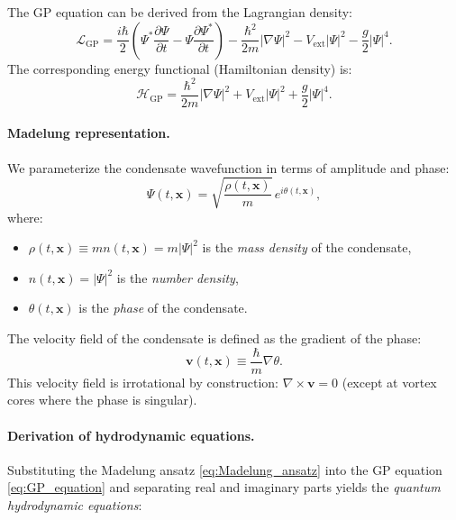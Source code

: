 The GP equation can be derived from the Lagrangian density:
\begin{equation}
\label{eq:GP_Lagrangian}
\mathcal{L}_{\mathrm{GP}} = \frac{i\hbar}{2}\left( \Psi^* \frac{\partial \Psi}{\partial t} - \Psi \frac{\partial \Psi^*}{\partial t} \right) - \frac{\hbar^2}{2m} |\nabla \Psi|^2 - V_{\mathrm{ext}} |\Psi|^2 - \frac{g}{2} |\Psi|^4.
\end{equation}
The corresponding energy functional (Hamiltonian density) is:
\begin{equation}
\label{eq:GP_energy}
\mathcal{H}_{\mathrm{GP}} = \frac{\hbar^2}{2m} |\nabla \Psi|^2 + V_{\mathrm{ext}} |\Psi|^2 + \frac{g}{2} |\Psi|^4.
\end{equation}

\paragraph{Madelung representation.}
We parameterize the condensate wavefunction in terms of amplitude and phase:
\begin{equation}
\label{eq:Madelung_ansatz}
\Psi(t, \mathbf{x}) = \sqrt{\frac{\rho(t, \mathbf{x})}{m}} \, e^{i\theta(t, \mathbf{x})},
\end{equation}
where:
\begin{itemize}[leftmargin=1.8em]
    \item $\rho(t, \mathbf{x}) \equiv m n(t, \mathbf{x}) = m |\Psi|^2$ is the \emph{mass density} of the condensate,
    \item $n(t, \mathbf{x}) = |\Psi|^2$ is the \emph{number density},
    \item $\theta(t, \mathbf{x})$ is the \emph{phase} of the condensate.
\end{itemize}

The velocity field of the condensate is defined as the gradient of the phase:
\begin{equation}
\label{eq:velocity_field}
\mathbf{v}(t, \mathbf{x}) \equiv \frac{\hbar}{m} \nabla \theta.
\end{equation}
This velocity field is irrotational by construction: $\nabla \times \mathbf{v} = 0$ (except at vortex cores where the phase is singular).

\paragraph{Derivation of hydrodynamic equations.}
Substituting the Madelung ansatz \eqref{eq:Madelung_ansatz} into the GP equation \eqref{eq:GP_equation} and separating real and imaginary parts yields the \emph{quantum hydrodynamic equations}:

